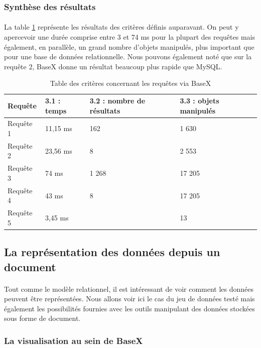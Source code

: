 \subsubsection{Synthèse des résultats}
\paragraph{}La table \ref{tab:critere-req1docbase} représente les résultats des critères définis auparavant. On peut y apercevoir une durée comprise entre 3 et 74 ms pour la plupart des requêtes mais également, en parallèle, un grand nombre d'objets manipulés, plus important que pour une base de données relationnelle. Nous pouvons également noté que sur la requête 2, BaseX donne un résultat beaucoup plus rapide que MySQL.
\begin{table}[h!]
    \centering
	\begin{tabular}{|p{3cm}|p{3cm}|p{3cm}|p{3cm}|} 
  	\hline
  	\textbf{Requête} & \textbf{3.1 : temps} & \textbf{3.2 : nombre de résultats} & \textbf{3.3 : objets manipulés} \\

  	\hline
  	Requête 1 & 11,15 ms & 162 & 1 630 \\
  	\hline
    Requête 2 & 23,56 ms & 8 & 2 553 \\
    \hline
    Requête 3 & 74 ms & 1 268 & 17 205 \\
    \hline
    Requête 4 & 43 ms & 8 & 17 205 \\
    \hline
    Requête 5 & 3,45 ms & & 13 \\
    \hline
	\end{tabular}
    \caption{Table des critères concernant les requêtes via BaseX}
    \label{tab:critere-req1docbase}
\end{table}

\subsection{La représentation des données depuis un document}
\paragraph{}Tout comme le modèle relationnel, il est intéressant de voir comment les données peuvent être représentées. Nous allons voir ici le cas du jeu de données testé mais également les possibilités fournies avec les outils manipulant des données stockées sous forme de document.


\subsubsection{La visualisation au sein de BaseX}
